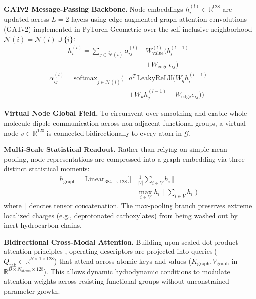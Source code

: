 \documentclass[10pt,twocolumn]{article}
\begin{document}
\textbf{GATv2 Message-Passing Backbone.} Node embeddings $h_i^{(l)} \in \mathbb{R}^{128}$ are updated across $L=2$ layers using edge-augmented graph attention convolutions (GATv2) \cite{brody2022} implemented in PyTorch Geometric \cite{fey2019} over the self-inclusive neighborhood $\widetilde{\mathcal{N}}(i) = \mathcal{N}(i) \cup \{i\}$:
\begin{equation}
\begin{split}
h_i^{(l)} = \sum_{j \in \widetilde{\mathcal{N}}(i)} \alpha_{ij}^{(l)} \, &W_{\mathrm{value}}^{(l)} \Big( h_j^{(l-1)} \\
&+ W_{\mathrm{edge}} \, e_{ij} \Big)
\end{split}
\label{eq:gat_update}
\end{equation}
\begin{equation}
\begin{split}
\alpha_{ij}^{(l)} = \mathrm{softmax}_{j \in \widetilde{\mathcal{N}}(i)} \Big( &a^{T} \, \mathrm{LeakyReLU} \big( W_{q} h_i^{(l-1)} \\
&+ W_{k} h_j^{(l-1)} + W_{\mathrm{edge}} e_{ij} \big) \Big)
\end{split}
\label{eq:gat_attn}
\end{equation}

\textbf{Virtual Node Global Field.} To circumvent over-smoothing and enable whole-molecule dipole communication across non-adjacent functional groups, a virtual node $v \in \mathbb{R}^{128}$ is connected bidirectionally to every atom in $\mathcal{G}$.

\textbf{Multi-Scale Statistical Readout.} Rather than relying on simple mean pooling, node representations are compressed into a graph embedding via three distinct statistical moments:
\begin{equation}
\begin{split}
h_{\mathrm{graph}} = \mathrm{Linear}_{384 \to 128} \bigg( \bigg[ &\frac{1}{|V|}\sum_{i \in V} h_i \; \Big\Vert \\
&\max_{i \in V} h_i \; \Big\Vert \; \sum_{i \in V} h_i \bigg] \bigg)
\end{split}
\label{eq:readout}
\end{equation}
where $\Vert$ denotes tensor concatenation. The max-pooling branch preserves extreme localized charges (e.g., deprotonated carboxylates) from being washed out by inert hydrocarbon chains.

\textbf{Bidirectional Cross-Modal Attention.} Building upon scaled dot-product attention principles \cite{vaswani2017}, operating descriptors are projected into queries ($Q_{\mathrm{tab}} \in \mathbb{R}^{B \times 1 \times 128}$) that attend across atomic keys and values ($K_{\mathrm{graph}}, V_{\mathrm{graph}}$ in $\mathbb{R}^{B \times N_{\mathrm{atoms}} \times 128}$). This allows dynamic hydrodynamic conditions to modulate attention weights across resisting functional groups without unconstrained parameter growth.
\end{document}
